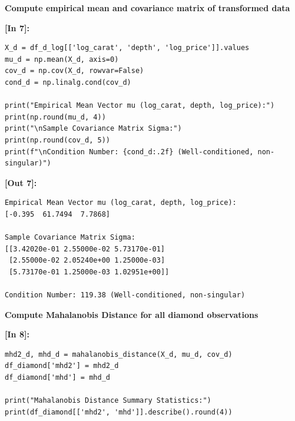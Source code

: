 \vspace{0.3em}
\vspace{0.3em}
\begin{tcolorbox}[colback=gray!5!white,colframe=gray!50!black,boxrule=0.5pt,arc=2pt,left=5pt,right=5pt,top=2pt,bottom=2pt,unbreakable,before upper={\sloppy\raggedright}]
{\small\bfseries Compute empirical mean and covariance matrix of transformed data\par}
\end{tcolorbox}
\vspace{0.2em}
\vspace{0.4em}
\noindent\textbf{\small [In 7]:}
\begin{lstlisting}[style=pycode]
X_d = df_d_log[['log_carat', 'depth', 'log_price']].values
mu_d = np.mean(X_d, axis=0)
cov_d = np.cov(X_d, rowvar=False)
cond_d = np.linalg.cond(cov_d)

print("Empirical Mean Vector mu (log_carat, depth, log_price):")
print(np.round(mu_d, 4))
print("\nSample Covariance Matrix Sigma:")
print(np.round(cov_d, 5))
print(f"\nCondition Number: {cond_d:.2f} (Well-conditioned, non-singular)")
\end{lstlisting}
\vspace{0.2em}
\noindent\textbf{\small [Out 7]:}
\begin{lstlisting}[style=output]
Empirical Mean Vector mu (log_carat, depth, log_price):
[-0.395  61.7494  7.7868]

Sample Covariance Matrix Sigma:
[[3.42020e-01 2.55000e-02 5.73170e-01]
 [2.55000e-02 2.05240e+00 1.25000e-03]
 [5.73170e-01 1.25000e-03 1.02951e+00]]

Condition Number: 119.38 (Well-conditioned, non-singular)
\end{lstlisting}
\vspace{0.3em}
\begin{tcolorbox}[colback=gray!5!white,colframe=gray!50!black,boxrule=0.5pt,arc=2pt,left=5pt,right=5pt,top=2pt,bottom=2pt,unbreakable,before upper={\sloppy\raggedright}]
{\small\bfseries Compute Mahalanobis Distance for all diamond observations\par}
\end{tcolorbox}
\vspace{0.2em}
\vspace{0.4em}
\noindent\textbf{\small [In 8]:}
\begin{lstlisting}[style=pycode]
mhd2_d, mhd_d = mahalanobis_distance(X_d, mu_d, cov_d)
df_diamond['mhd2'] = mhd2_d
df_diamond['mhd'] = mhd_d

print("Mahalanobis Distance Summary Statistics:")
print(df_diamond[['mhd2', 'mhd']].describe().round(4))
\end{lstlisting}
